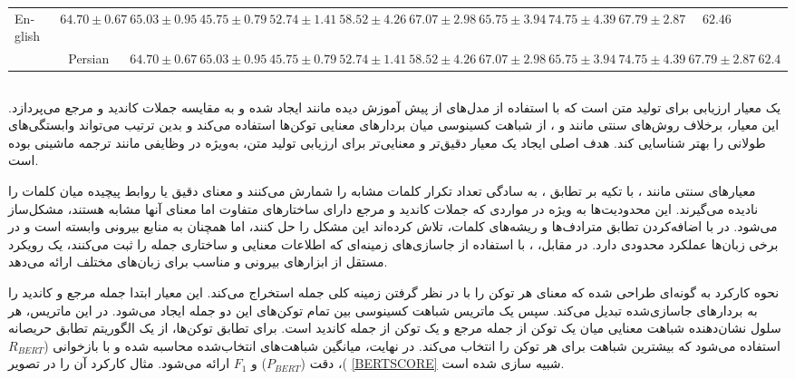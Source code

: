 \documentclass[11pt, a4paper, oneside]{book}
\begin{document}
\begin{table}
\begin{latin}
\begin{adjustbox}{max width=\textheight}
\begin{tabular}{lccccccccccc}
								English &
								$64.70 \pm 0.67$ &
								$65.03 \pm 0.95$ &
								$45.75 \pm 0.79$ &
								$52.74 \pm 1.41$ &
								$58.52 \pm 4.26$ &
								$67.07 \pm 2.98$ &
								$65.75 \pm 3.94$ &
								$74.75 \pm 4.39$ &
								$67.79 \pm 2.87$ &
								$62.46$
								\\ &
								Persian &
								$64.70 \pm 0.67$ &
								$65.03 \pm 0.95$ &
								$45.75 \pm 0.79$ &
								$52.74 \pm 1.41$ &
								$58.52 \pm 4.26$ &
								$67.07 \pm 2.98$ &
								$65.75 \pm 3.94$ &
								$74.75 \pm 4.39$ &
								$67.79 \pm 2.87$ &
								$62.46$
								\\
								\bottomrule
							\end{tabular}
						\end{adjustbox}
					\end{latin}
					\label{multiChoiceEnResults}
				\end{table}
				
			
			\subsection{}
					یک معیار ارزیابی برای تولید متن است که با استفاده از مدل‌های از پیش آموزش دیده مانند  ایجاد شده و به مقایسه جملات کاندید و مرجع می‌پردازد. این معیار، برخلاف روش‌های سنتی مانند  و ، از شباهت کسینوسی میان بردارهای معنایی توکن‌ها استفاده می‌کند و بدین ترتیب می‌تواند وابستگی‌های طولانی را بهتر شناسایی کند. هدف اصلی  ایجاد یک معیار دقیق‌تر و معنایی‌تر برای ارزیابی تولید متن، به‌ویژه در وظایفی مانند ترجمه ماشینی بوده است.
				
				معیارهای سنتی مانند ، با تکیه بر تطابق ، به سادگی تعداد تکرار کلمات مشابه را شمارش می‌کنند و معنای دقیق یا روابط پیچیده میان کلمات را نادیده می‌گیرند. این محدودیت‌ها به ویژه در مواردی که جملات کاندید و مرجع دارای ساختارهای متفاوت اما معنای آنها مشابه هستند، مشکل‌ساز می‌شود. در  با اضافه‌کردن تطابق مترادف‌ها و ریشه‌های کلمات، تلاش کرده‌اند این مشکل را حل کنند، اما همچنان به منابع بیرونی وابسته است و در برخی زبان‌ها عملکرد محدودی دارد. در مقابل، ، با استفاده از جاسازی‌های زمینه‌ای که اطلاعات معنایی و ساختاری جمله را ثبت می‌کنند، یک رویکرد مستقل از ابزارهای بیرونی و مناسب برای زبان‌های مختلف ارائه می‌دهد.
				
				نحوه کارکرد  به گونه‌ای طراحی شده که معنای هر توکن را با در نظر گرفتن زمینه کلی جمله استخراج می‌کند. این معیار ابتدا جمله مرجع و کاندید را به بردارهای جاسازی‌شده تبدیل می‌کند. سپس یک ماتریس شباهت کسینوسی بین تمام توکن‌های این دو جمله ایجاد می‌شود. در این ماتریس، هر سلول نشان‌دهنده شباهت معنایی میان یک توکن از جمله مرجع و یک توکن از جمله کاندید است. برای تطابق توکن‌ها، از یک الگوریتم تطابق حریصانه استفاده می‌شود که بیشترین شباهت برای هر توکن را انتخاب می‌کند. در نهایت، میانگین شباهت‌های انتخاب‌شده محاسبه شده و با بازخوانی ($R_{BERT}$)، دقت ($P_{BERT}$) و $F_1$ ارائه می‌شود. مثال کارکرد آن را در تصویر \ref{BERTSCORE} شبیه سازی شده است.
				
\end{document}
